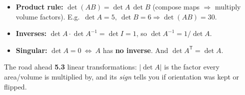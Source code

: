 \documentclass[aspectratio=169, 11pt]{beamer}
\newcommand{\T}{\mathsf{T}}
\begin{document}
\begin{frame}[t, plain]
  \begin{itemize}
    \setlength{\itemsep}{6pt}
    \item \textbf{Product rule:} $\det(AB)=\det A\,\det B$ (compose maps $\Rightarrow$ multiply volume factors).
          E.g.\ $\det A=5,\ \det B=6\Rightarrow\det(AB)=30$.
    \item \textbf{Inverses:} $\det A\cdot\det A^{-1}=\det I=1$, so $\det A^{-1}=1/\det A$.
    \item \textbf{Singular:} $\det A=0\ \Leftrightarrow\ A$ has \textbf{no inverse}. \; And $\det A^{\T}=\det A$.
  \end{itemize}
  \vspace{2pt}
  \begin{block}{The road ahead}
    \textbf{5.3} linear transformations: $|\det A|$ is the factor every area/volume is multiplied by,
    and its \emph{sign} tells you if orientation was kept or flipped.
  \end{block}
\end{frame}
\end{document}
